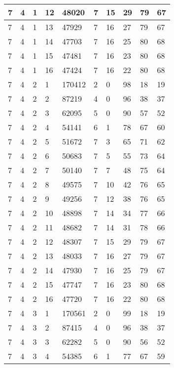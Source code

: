 \begin{table}[!ht]
\begin{tabular}{|l|l|l|l|l|l|l|l|l|l|}
        7 & 4 & 1 & 12 & 48020 & 7 & 15 & 29 & 79 & 67 \\ \hline
        7 & 4 & 1 & 13 & 47929 & 7 & 16 & 27 & 79 & 67 \\ \hline
        7 & 4 & 1 & 14 & 47703 & 7 & 16 & 25 & 80 & 68 \\ \hline
        7 & 4 & 1 & 15 & 47481 & 7 & 16 & 23 & 80 & 68 \\ \hline
        7 & 4 & 1 & 16 & 47424 & 7 & 16 & 22 & 80 & 68 \\ \hline
        7 & 4 & 2 & 1 & 170412 & 2 & 0 & 98 & 18 & 19 \\ \hline
        7 & 4 & 2 & 2 & 87219 & 4 & 0 & 96 & 38 & 37 \\ \hline
        7 & 4 & 2 & 3 & 62095 & 5 & 0 & 90 & 57 & 52 \\ \hline
        7 & 4 & 2 & 4 & 54141 & 6 & 1 & 78 & 67 & 60 \\ \hline
        7 & 4 & 2 & 5 & 51672 & 7 & 3 & 65 & 71 & 62 \\ \hline
        7 & 4 & 2 & 6 & 50683 & 7 & 5 & 55 & 73 & 64 \\ \hline
        7 & 4 & 2 & 7 & 50140 & 7 & 7 & 48 & 75 & 64 \\ \hline
        7 & 4 & 2 & 8 & 49575 & 7 & 10 & 42 & 76 & 65 \\ \hline
        7 & 4 & 2 & 9 & 49256 & 7 & 12 & 38 & 76 & 65 \\ \hline
        7 & 4 & 2 & 10 & 48898 & 7 & 14 & 34 & 77 & 66 \\ \hline
        7 & 4 & 2 & 11 & 48682 & 7 & 14 & 31 & 78 & 66 \\ \hline
        7 & 4 & 2 & 12 & 48307 & 7 & 15 & 29 & 79 & 67 \\ \hline
        7 & 4 & 2 & 13 & 48033 & 7 & 16 & 27 & 79 & 67 \\ \hline
        7 & 4 & 2 & 14 & 47930 & 7 & 16 & 25 & 79 & 67 \\ \hline
        7 & 4 & 2 & 15 & 47747 & 7 & 16 & 23 & 80 & 68 \\ \hline
        7 & 4 & 2 & 16 & 47720 & 7 & 16 & 22 & 80 & 68 \\ \hline
        7 & 4 & 3 & 1 & 170561 & 2 & 0 & 99 & 18 & 19 \\ \hline
        7 & 4 & 3 & 2 & 87415 & 4 & 0 & 96 & 38 & 37 \\ \hline
        7 & 4 & 3 & 3 & 62282 & 5 & 0 & 90 & 56 & 52 \\ \hline
        7 & 4 & 3 & 4 & 54385 & 6 & 1 & 77 & 67 & 59 \\ \hline

\end{tabular}
\end{table}
